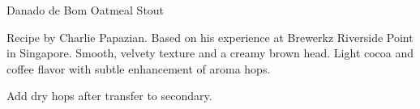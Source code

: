\begin{recipe}{Danado de Bom Oatmeal Stout}

\begin{aboutblock}
Recipe by Charlie Papazian. Based on his experience at Brewerkz Riverside
Point in Singapore. Smooth, velvety texture and a creamy brown head. Light cocoa
and coffee flavor with subtle enhancement of aroma hops.
\end{aboutblock}


\begin{methodandtiming}

\begin{mashsteps}
\end{mashsteps}

\begin{fermentationsteps}
\end{fermentationsteps}

\begin{directions}
Add dry hops after transfer to secondary.
\end{directions}

\end{methodandtiming}

\recipebreak

\begin{ingredientsblock}

\begin{malts}
\end{malts}

\begin{hops}
\end{hops}


\end{ingredientsblock}

\end{recipe}


